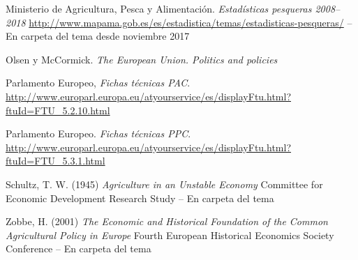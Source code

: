 \documentclass{nuevotema}
\begin{document}
Ministerio de Agricultura, Pesca y Alimentación. \textit{Estadísticas pesqueras 2008--2018} \url{http://www.mapama.gob.es/es/estadistica/temas/estadisticas-pesqueras/} -- En carpeta del tema desde noviembre 2017

Olsen y McCormick. \textit{The European Union. Politics and policies}

Parlamento Europeo, \textit{Fichas técnicas PAC}. \url{http://www.europarl.europa.eu/atyourservice/es/displayFtu.html?ftuId=FTU_5.2.10.html}

Parlamento Europeo. \textit{Fichas técnicas PPC}. \url{http://www.europarl.europa.eu/atyourservice/es/displayFtu.html?ftuId=FTU_5.3.1.html}

Schultz, T. W. (1945) \textit{Agriculture in an Unstable Economy} Committee for Economic Development Research Study -- En carpeta del tema

Zobbe, H. (2001) \textit{The Economic and Historical Foundation of the Common Agricultural Policy in Europe} Fourth European Historical Economics Society Conference -- En carpeta del tema
\end{document}

